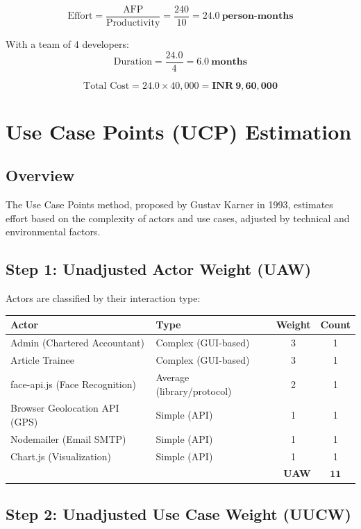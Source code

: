 \documentclass[12pt,a4paper]{article}
\begin{document}
\[
\text{Effort} = \frac{\text{AFP}}{\text{Productivity}} = \frac{240}{10} = \mathbf{24.0~\text{person-months}}
\]

With a team of 4 developers:
\[
\text{Duration} = \frac{24.0}{4} = \mathbf{6.0~\text{months}}
\]

\[
\text{Total Cost} = 24.0 \times 40{,}000 = \mathbf{\textrm{INR}~9,60,000}
\]

\section{Use Case Points (UCP) Estimation}

\subsection{Overview}
The Use Case Points method, proposed by Gustav Karner in 1993, estimates effort based on the complexity of actors and use cases, adjusted by technical and environmental factors.

\subsection{Step 1: Unadjusted Actor Weight (UAW)}

Actors are classified by their interaction type:
\begin{center}
\begin{tabular}{llcc}
\toprule
\textbf{Actor} & \textbf{Type} & \textbf{Weight} & \textbf{Count} \\
\midrule
Admin (Chartered Accountant) & Complex (GUI-based) & 3 & 1 \\
Article Trainee & Complex (GUI-based) & 3 & 1 \\
face-api.js (Face Recognition) & Average (library/protocol) & 2 & 1 \\
Browser Geolocation API (GPS) & Simple (API) & 1 & 1 \\
Nodemailer (Email SMTP) & Simple (API) & 1 & 1 \\
Chart.js (Visualization) & Simple (API) & 1 & 1 \\
\midrule
\multicolumn{3}{r}{\textbf{UAW}} & $\mathbf{11}$ \\
\bottomrule
\end{tabular}
\end{center}

\subsection{Step 2: Unadjusted Use Case Weight (UUCW)}
\end{document}
